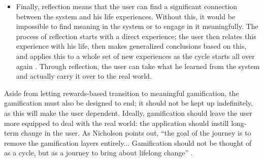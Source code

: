 \begin{itemize}
\item Finally, reflection means that the user can find a significant connection between the system and his life experiences. Without this, it would be impossible to find meaning in the system or to engage in it meaningfully. The process of reflection starts with a direct experience; the user then relates this experience with his life, then makes generalized conclusions based on this, and applies this to a whole set of new experiences as the cycle starts all over again \cite{kolb1981learning}. Through reflection, the user can take what he learned from the system and actually carry it over to the real world.
\end{itemize}

Aside from letting rewards-based transition to meaningful gamification, the gamification must also be designed to end; it should not be kept up indefinitely, as this will make the user dependent. Ideally, gamification should leave the user more equipped to deal with the real world: the application should instill long-term change in the user. As Nicholson points out, \enquote{the goal of the journey is to remove the gamification layers entirely... Gamification should not be thought of as a cycle, but as a journey to bring about lifelong change} \cite{scottnicholson2014}.
